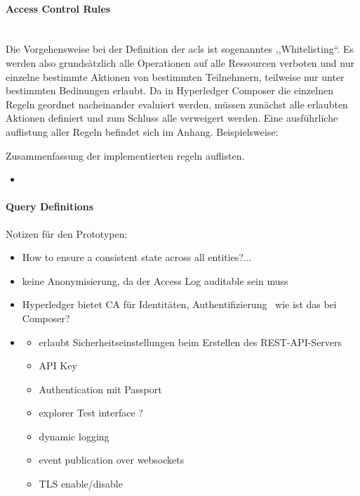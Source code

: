     \paragraph{\textrm{Access Control Rules}}\hspace{0cm}\\
        Die Vorgehensweise bei der Definition der \gls{acl}s ist sogenanntes ,,Whitelisting``. 
        Es werden also grundsätzlich alle Operationen auf alle Ressourcen verboten und nur einzelne bestimmte Aktionen von bestimmten Teilnehmern, teilweise nur unter bestimmten Bedinungen erlaubt. 
        Da in Hyperledger Composer die einzelnen Regeln geordnet nacheinander evaluiert werden, müssen zunächst alle erlaubten Aktionen definiert und zum Schluss alle verweigert werden. 
        Eine ausführliche auflistung aller Regeln befindet sich im Anhang. 
        Beispielsweise:
        
        Zusammenfassung der implementierten regeln auflisten.
        \begin{itemize}[noitemsep]
            \item 
        \end{itemize}
        
    \paragraph{Query Definitions}
    

    Notizen für den Prototypen:
    \begin{itemize}[noitemsep]
        \item How to ensure a consistent state across all entities?...
        \item keine Anonymisierung, da der Access Log auditable sein muss
        \item Hyperledger bietet CA für Identitäten, Authentifizierung \textrightarrow\ wie ist das bei Composer?
        \item \begin{itemize}
            \item erlaubt Sicherheitseinstellungen beim Erstellen des REST-API-Servers
            \item API Key
            \item Authentication mit Passport
            \item explorer Test interface ?
            \item dynamic logging
            \item event publication over websockets
            \item TLS enable/\-disable
        \end{itemize}
    \end{itemize}
    